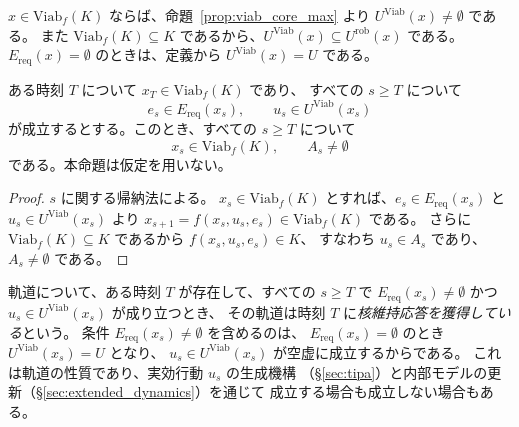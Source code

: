 $x\in\mathrm{Viab}_f(K)$ ならば、命題~\ref{prop:viab_core_max} より $U^{\mathrm{Viab}}(x)\neq\emptyset$ である。
また $\mathrm{Viab}_f(K)\subseteq K$ であるから、$U^{\mathrm{Viab}}(x)\subseteq U^{\mathrm{rob}}(x)$ である。
$E_{\mathrm{req}}(x)=\emptyset$ のときは、定義から $U^{\mathrm{Viab}}(x)=U$ である。

\begin{proposition}[核に留まる応答を選び続ける軌道]
\label{prop:kernel_maintenance}
ある時刻 $T$ について $x_T\in\mathrm{Viab}_f(K)$ であり、
すべての $s\ge T$ について
\[
  e_s\in E_{\mathrm{req}}(x_s),
  \qquad
  u_s\in U^{\mathrm{Viab}}(x_s)
\]
が成立するとする。このとき、すべての $s\ge T$ について
\[
  x_s\in\mathrm{Viab}_f(K),
  \qquad
  A_s\neq\emptyset
\]
である。本命題は仮定を用いない。
\end{proposition}

\begin{proof}
$s$ に関する帰納法による。
$x_s\in\mathrm{Viab}_f(K)$ とすれば、$e_s\in E_{\mathrm{req}}(x_s)$ と $u_s\in U^{\mathrm{Viab}}(x_s)$ より
$x_{s+1}=f(x_s,u_s,e_s)\in\mathrm{Viab}_f(K)$ である。
さらに $\mathrm{Viab}_f(K)\subseteq K$ であるから $f(x_s,u_s,e_s)\in K$、
すなわち $u_s\in A_s$ であり、$A_s\neq\emptyset$ である。
\end{proof}

\begin{definition}
\label{def:kernel_response_acquisition}
軌道について、ある時刻 $T$ が存在して、すべての $s\ge T$ で
$E_{\mathrm{req}}(x_s)\neq\emptyset$ かつ $u_s\in U^{\mathrm{Viab}}(x_s)$ が成り立つとき、
その軌道は時刻 $T$ に\emph{核維持応答を獲得している}という。
条件 $E_{\mathrm{req}}(x_s)\neq\emptyset$ を含めるのは、
$E_{\mathrm{req}}(x_s)=\emptyset$ のとき $U^{\mathrm{Viab}}(x_s)=U$ となり、
$u_s\in U^{\mathrm{Viab}}(x_s)$ が空虚に成立するからである。
これは軌道の性質であり、実効行動 $u_s$ の生成機構
（\S\ref{sec:tipa}）と内部モデルの更新（\S\ref{sec:extended_dynamics}）を通じて
成立する場合も成立しない場合もある。
\end{definition}

